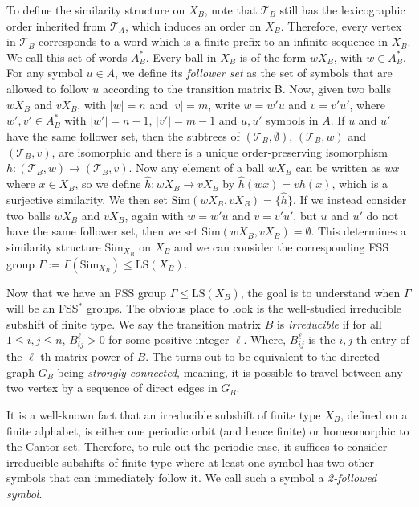 \documentclass[12pt]{amsart}
\numberwithin{equation}{subsection}
\theoremstyle{definition}
\theoremstyle{definition}
\theoremstyle{remark}
\begin{document}
To define the similarity structure on $X_B$, note that $\mathcal T_B$ still has the lexicographic order inherited from $\mathcal T_A$, which induces an order on $X_B$. Therefore, every vertex in $\mathcal T_B$ corresponds to a word which is a finite prefix to an infinite sequence in $X_B$. We call this set of words $A^*_B$.  Every ball in $X_B$ is of the form $wX_B$, with $w \in A^*_B$. For any symbol $u \in A$, we define its \textit{follower set} as the set of symbols that are allowed to follow $u$ according to the transition matrix B. Now, given two balls $wX_B$ and $vX_B$, with $\vert w \vert =n$ and $\vert v \vert = m$, write $w=w'u$ and $v=v'u'$, where $w',v' \in A^*_B$ with $\vert w' \vert = n-1$, $\vert v' \vert = m-1$ and $u, u'$ symbols in $A$. If $u$ and $u'$ have the same follower set, then the subtrees of $(\mathcal T_B,\emptyset)$, $(\mathcal T_B, w)$ and $(\mathcal T_B,v)$, are isomorphic and there is a unique order-preserving isomorphism $h: (\mathcal T_B, w) \rightarrow (\mathcal T_B, v)$. Now any element of a ball $wX_B$ can be written as $wx$ where $x \in X_B$, so we define $\hat h : wX_B \rightarrow vX_B$ by $\hat h (wx) = vh(x)$, which is a surjective similarity. We then set $\text{Sim}(wX_B,vX_B) = \{ \hat h \}$. If we instead consider two balls $wX_B$ and $vX_B$, again with $w=w'u$ and $v=v'u'$, but $u$ and $u'$ do not have the same follower set, then we set $\text{Sim}(wX_B,vX_B) = \emptyset$. This determines a similarity structure $\text{Sim}_{X_B}$ on $X_B$ and we can consider the corresponding FSS group $\Gamma :=\Gamma(\text{Sim}_{X_B}) \leq \text{LS}(X_B)$. 


Now that we have an FSS group $\Gamma \leq \text{LS}(X_B)$, the goal is to understand when $\Gamma$ will be an FSS$^*$ groups. The obvious place to look is the well-studied irreducible subshift of finite type. We say the transition matrix $B$ is \textit{irreducible} if for all $1 \leq i,j \leq n$, $B^\ell_{ij} >0$ for some positive integer $\ell$. Where,  $B^\ell_{ij}$ is the $i,j$-th entry of the $\ell$-th matrix power of $B$. The turns out to be equivalent to the directed graph $G_B$ being \textit{strongly connected}, meaning, it is possible to travel between any two vertex by a sequence of direct edges in $G_B$. 



It is a well-known fact that an irreducible subshift of finite type $X_B$, defined on a finite alphabet, is either one periodic orbit (and hence finite) or homeomorphic to the Cantor set.  Therefore, to rule out the periodic case, it suffices to consider irreducible subshifts of finite type where at least one symbol has two other symbols that can immediately follow it. We call such a symbol a \textit{2-followed symbol}. 
\end{document}
